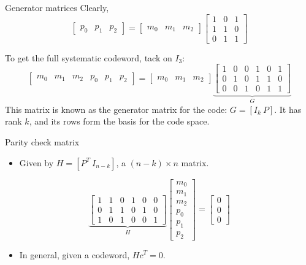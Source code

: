 \documentclass[aspectratio=1610, 10pt]{beamer}
\begin{document}
\begin{frame}[label={sec:org5ecd11e}]{Generator matrices}
Clearly,
$$\begin{bmatrix} p_0 & p_1 & p_2 \end{bmatrix} = \begin{bmatrix} m_0
& m_1 & m_2 \end{bmatrix} \begin{bmatrix}
1&0&1\\1&1&0\\0&1&1\end{bmatrix}$$

To get the full systematic codeword, tack on \(I_3\):
$$\begin{bmatrix} m_0 & m_1 & m_2 & p_0 & p_1 & p_2 \end{bmatrix} = \begin{bmatrix} m_0
& m_1 & m_2 \end{bmatrix} \underbrace{\begin{bmatrix}
1&0&0&1&0&1\\0&1&0&1&1&0\\0&0&1&0&1&1\end{bmatrix}}_{G}$$
This matrix is known as the generator matrix for the code: \(G =
[I_k~P]\). It has rank \(k\), and its rows form the basis for the code
space.
\end{frame}

\begin{frame}[label={sec:orgfb90911}]{Parity check matrix}
\begin{itemize}
\item Given by \(H = [P^T~I_{n-k}]\), a \((n-k)\times n\) matrix.
\end{itemize}
$$\underbrace{\begin{bmatrix}
1&1&0&1&0&0\\0&1&1&0&1&0\\1&0&1&0&0&1\end{bmatrix}}_{H} \begin{bmatrix}
m_0 \\ m_1 \\ m_2 \\ p_0 \\ p_1 \\ p_2\end{bmatrix} = \begin{bmatrix}
0\\0\\0\end{bmatrix}$$

\begin{itemize}
\item In general, given a codeword, \(Hc^{T} = 0\).
\end{itemize}
\end{frame}
\end{document}
